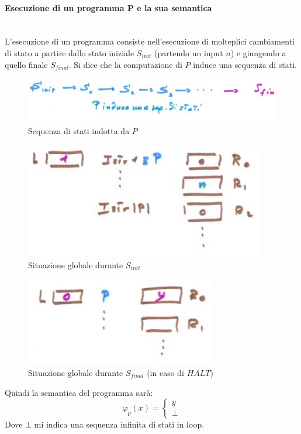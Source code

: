 \documentclass{article}
\begin{document}
\paragraph{Esecuzione di un programma P e la sua semantica}\mbox{}\\
L'esecuzione di un programma consiste nell'esecuzione di molteplici cambiamenti di stato a partire
dallo stato iniziale $S_{init}$ (partendo un input $n$)
e giungendo a quello finale $S_{final}$. Si dice che la computazione
di $P$ induce una sequenza di stati.
\begin{figure}[H]
    \centering
    \includegraphics[scale=0.5]{images/stati_seq.png}
    \caption{Sequenza di stati indotta da $P$}
\end{figure}
\begin{figure}[H]
    \centering
    \includegraphics[scale=0.5]{images/stato_init.png}
    \caption{Situazione globale durante $S_{init}$}
\end{figure}
\begin{figure}[H]
    \centering
    \includegraphics[scale=0.5]{images/stato_fina.png}
    \caption{Situazione globale durante $S_{final}$ (in caso di $HALT$)}
\end{figure}
Quindi la semantica del programma sarà:
\[
    \varphi_p(x) =
    \begin{cases}
        y \\
        \bot
    \end{cases}
\]
Dove $\bot$ mi indica una sequenza infinita di stati in loop.
\end{document}
